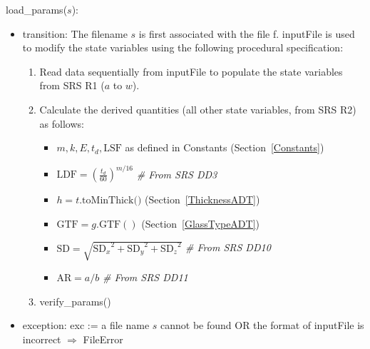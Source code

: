 \documentclass[12pt, titlepage]{article}
\begin{document}
\noindent load\_params($s$):
\begin{itemize}
\item transition: The filename $s$ is first associated with the file f.  {inputFile} is used to
  modify the state variables using the following procedural specification:
\begin{enumerate}
\item Read data sequentially from inputFile to populate the state variables from
  SRS R1 ($a$ to $w$).
\item Calculate the derived quantities (all other state variables, from SRS R2) as follows:
\begin{itemize}
\item $m, k, E, t_d, \mbox{LSF}$ as defined in Constants
  (Section~\ref{Constants})
\item $\text{LDF}=(\frac{t_d}{60})^{m/16}$ \textit{\# From SRS DD3}
\item $h = t.\mbox{toMinThick()}$ (Section~\ref{ThicknessADT})
\item $\mbox{GTF} = g.\mbox{GTF}()$ (Section~\ref{GlassTypeADT})
\item $\mbox{SD} = \sqrt{{\text{SD}_x}^2 + {\text{SD}_y}^2 + {\text{SD}_z}^2}$ \textit{\# From SRS DD10}
\item $\mbox{AR} = a/b$ \textit{\# From SRS DD11}
\end{itemize}
\item verify\_params()
\end{enumerate}

\item exception: exc := a file name $s$ cannot be found OR the format of
  inputFile is incorrect $\Rightarrow$  FileError
\end{itemize}
\end{document}
